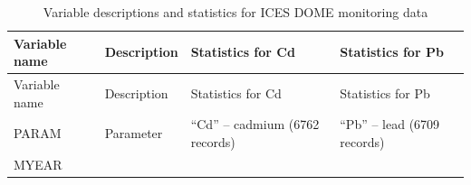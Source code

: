 \documentclass[
  12pt,
]{article}
\begin{document}
\newpage

\begin{longtable}[]{@{}llll@{}}
\caption{Variable descriptions and statistics for ICES DOME monitoring
data}\tabularnewline
\toprule
\begin{minipage}[b]{0.15\columnwidth}\raggedright
Variable name\strut
\end{minipage} & \begin{minipage}[b]{0.22\columnwidth}\raggedright
Description\strut
\end{minipage} & \begin{minipage}[b]{0.25\columnwidth}\raggedright
Statistics for Cd\strut
\end{minipage} & \begin{minipage}[b]{0.25\columnwidth}\raggedright
Statistics for Pb\strut
\end{minipage}\tabularnewline
\midrule
\endfirsthead
\toprule
\begin{minipage}[b]{0.15\columnwidth}\raggedright
Variable name\strut
\end{minipage} & \begin{minipage}[b]{0.22\columnwidth}\raggedright
Description\strut
\end{minipage} & \begin{minipage}[b]{0.25\columnwidth}\raggedright
Statistics for Cd\strut
\end{minipage} & \begin{minipage}[b]{0.25\columnwidth}\raggedright
Statistics for Pb\strut
\end{minipage}\tabularnewline
\midrule
\endhead
\begin{minipage}[t]{0.15\columnwidth}\raggedright
PARAM\strut
\end{minipage} & \begin{minipage}[t]{0.22\columnwidth}\raggedright
Parameter\strut
\end{minipage} & \begin{minipage}[t]{0.25\columnwidth}\raggedright
``Cd'' -- cadmium (6762 records)\strut
\end{minipage} & \begin{minipage}[t]{0.25\columnwidth}\raggedright
``Pb'' -- lead (6709 records)\strut
\end{minipage}\tabularnewline
\begin{minipage}[t]{0.15\columnwidth}\raggedright
MYEAR\strut
\end{minipage} & \begin{minipage}[t]{0.22\columnwidth}\raggedright

\end{minipage}
\end{longtable}
\end{document}
